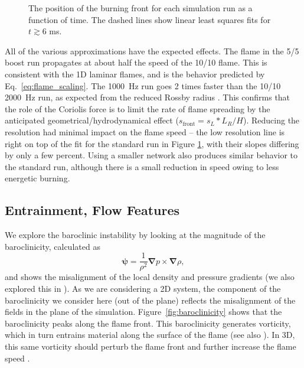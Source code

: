 \documentclass[preprint,times,tighten]{aastex63}
\newcommand{\nablab}{\mathbf{\nabla}}
\begin{document}
\begin{figure}[t]
\centering
{}
\caption{\label{fig:flame_speed}The position of the burning front for each simulation run as a function of time. The dashed lines show linear least squares fits for $t \gtrsim 6$ ms.}
\end{figure}

All of the various approximations have the expected effects. The flame in the 5/5
boost run propagates at about half the speed of the 10/10 flame. This is consistent
with the 1D laminar flames, and is the behavior predicted by Eq.~\ref{eq:flame_scaling}. The
1000~Hz run goes 2 times faster than the 10/10 2000~Hz run, as expected from the reduced
Rossby radius \citep{cavecchi:2013}. This confirms that the role of the Coriolis
force is to limit the rate of flame spreading by the anticipated geometrical/hydrodynamical
effect ($s_\mathrm{front} = s_L * L_R / H$). Reducing the resolution had minimal impact on
the flame speed -- the low resolution line is right on top of the fit for the standard run
in Figure \ref{fig:flame_speed}, with their slopes differing by only a few percent. Using a
smaller network also produces similar behavior to the standard run, although there is a small
reduction in speed owing to less energetic burning.


\subsection{Entrainment, Flow Features}

We explore the baroclinic instability by looking at the magnitude of the 
baroclinicity, calculated as
\begin{equation}
    \boldsymbol{\psi} = \frac{1}{\rho^2} \nablab p \times \nablab \rho,
\end{equation}
and shows the misalignment of the local density and pressure gradients
(we also explored this in \citep{Malone2014a}). As we are considering a 2D system, the
component of the baroclinicity we consider here (out of the plane)
reflects the misalignment of the fields in the plane of the
simulation. Figure~\ref{fig:baroclinicity} shows that the
baroclinicity peaks along the flame front. This baroclinicity
generates vorticity, which in turn entrains material along the surface
of the flame (see also \citealt{cavecchi:2013}). In 3D, this same vorticity
should perturb the flame front and further increase the flame speed
\citep{Cavecchi2019}.
\end{document}

